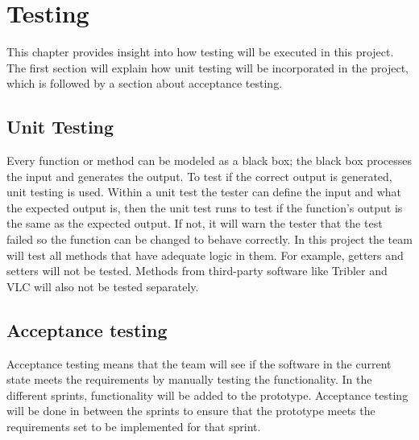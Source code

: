 \chapter{Testing}
\thispagestyle{fancy}
\label{sec:test}
This chapter provides insight into how testing will be executed in this project. The first section will explain how unit testing will be incorporated  in the project, which is followed by a section about acceptance testing.

\section{Unit Testing}
Every function or method can be modeled as a black box; the black box processes the input and generates the output. To test if the correct output is generated, unit testing is used. Within a unit test the tester can define the input and what the expected output is, then the unit test runs to test if the function's output is the same as the expected output. If not, it will warn the tester that the test failed so the function can be changed to behave correctly. 
In this project the team will test all methods that have adequate logic in them. For example, getters and setters will not be tested. Methods from third-party software like Tribler and VLC will also not be tested separately. 

\section{Acceptance testing}
Acceptance testing means that the team will see if the software in the current state meets the requirements by manually testing the functionality. In the different sprints, functionality will be added to the prototype. Acceptance testing will be done in between the sprints to ensure that the prototype meets the requirements set to be implemented for that sprint.